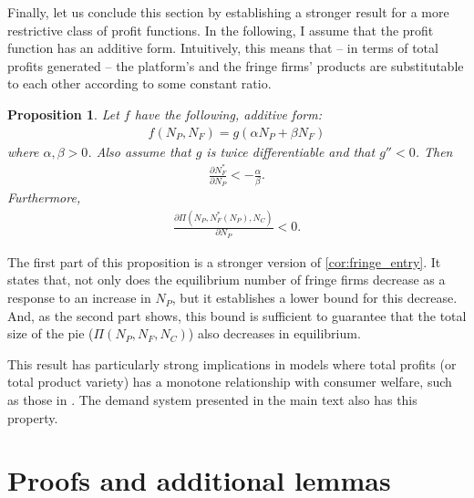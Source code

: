 \documentclass[a4paper]{article}
\newtheorem{proposition}{Proposition}
\begin{document}
Finally, let us conclude this section by establishing a stronger result for a more restrictive class of profit functions.
In the following, I assume that the profit function has an additive form.
Intuitively, this means that -- in terms of total profits generated -- the platform's and the fringe firms' products are substitutable to each other according to some constant ratio.
\begin{proposition}
    \label{prop:aggregate_size_additive}
    Let $f$ have the following, additive form:
    \begin{align*}
        f(N_P, N_F) = g(\alpha N_P + \beta N_F)
    \end{align*}
    where $\alpha, \beta > 0$.
    Also assume that $g$ is twice differentiable and that $g'' < 0$.
    Then
    \begin{align*}
        \frac{\partial N_F^*}{\partial N_P} < -\frac{\alpha}{\beta}.
    \end{align*}
    Furthermore,
    \begin{align*}
        \frac{\partial \Pi(N_P, N_F^*(N_P), N_C)}{\partial N_P} < 0.
    \end{align*}
\end{proposition}

The first part of this proposition is a stronger version of \cref{cor:fringe_entry}.
It states that, not only does the equilibrium number of fringe firms decrease as a response to an increase in $N_P$, but it establishes a lower bound for this decrease.
And, as the second part shows, this bound is sufficient to guarantee that the total size of the pie ($\Pi(N_P, N_F, N_C)$) also decreases in equilibrium.

This result has particularly strong implications in models where total profits (or total product variety) has a monotone relationship with consumer welfare, such as those in \textcite{anderson2020aggregative}.
The demand system presented in the main text also has this property.

\section{Proofs and additional lemmas}
\end{document}

